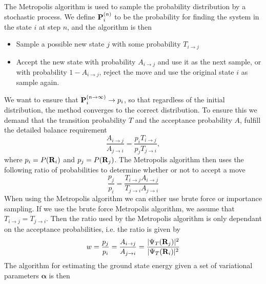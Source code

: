 \documentclass[../main.tex]{subfiles}
\begin{document}
The Metropolis algorithm is used to sample the probability distribution by a stochastic process. We define ${\bf P}_i^{(n)}$ to be the probability for finding the system in the state $i$ at step $n$, and the algorithm is then
\begin{itemize}
 \item Sample a possible new state $j$ with some probability $T_{i\rightarrow j}$
 \item Accept the new state with probability $A_{i\rightarrow j}$ and use it as the next sample, or with probability $1 - A_{i\rightarrow j}$, reject the move and use the original state $i$ as sample again.
\end{itemize}
We want to ensure that ${\bf P}_i^{(n\rightarrow \infty)} \rightarrow p_i$, so that regardless of the initial distribution, the method converges to the correct distribution. To ensure this we demand that the transition probability $T$ and the acceptance probability $A$, fulfill the detailed balance requirement
\begin{equation}\label{eq: DB}
 \frac{A_{i\rightarrow j}}{A_{j\rightarrow i}} = \frac{p_i T_{i\rightarrow j}}{p_j T_{j\rightarrow i}},
\end{equation}
where $p_i = P({\bf R}_i)$ and $p_j = P({\bf R}_j)$.
The Metropolis algorithm then uses the following ratio of probabilities to determine whether or not to accept a move
\begin{equation}\label{eq: ratio}
 \frac{p_j}{p_i} = \frac{T_{i\rightarrow j} A_{i\rightarrow j}}{T_{j\rightarrow i} A_{j\rightarrow i}}
\end{equation}
When using the Metropolis algorithm we can either use brute force or importance sampling. If we use the brute force Metropolis algorithm, we assume that $T_{i\rightarrow j} = T_{j\rightarrow i}$. Then the ratio used by the Metropolis algorithm is only dependant on the acceptance probabilities, i.e. the ratio is given by
\begin{equation}\label{ratio2}
 w = \frac{p_j}{p_i} = \frac{A_{i\rightarrow j}}{ A_{j\rightarrow i}} = \frac{|\Psi_T({\bf R}_j)|^2}{|\Psi_T({\bf R}_i)|^2}
\end{equation}
The algorithm for estimating the ground state energy given a set of variational parameters $\mathbf{\alpha}$ is then
\end{document}
